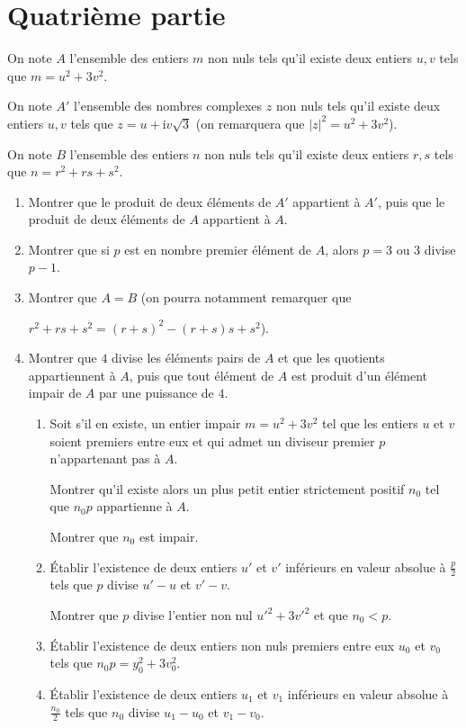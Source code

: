\newpage

\section*{\color{blue}Quatrième partie}
On note $A$ l'ensemble des entiers $m$ non nuls tels qu'il existe
deux entiers $u, v$ tels que $m = u^2 + 3v^2$.

On note $A'$ l'ensemble des nombres complexes $z$ non nuls tels qu'il existe deux entiers
$u, v$ tels que $z = u + \text{i}v\sqrt 3$ (on remarquera que
$|z|^2 = u^2 + 3v^2$).

On note $B$ l'ensemble des entiers $n$ non nuls
tels qu'il existe deux entiers $r,s$ tels que $n=r^2 + rs + s^2$.
\begin{enumerate}
\item Montrer que le produit de deux éléments de $A'$ appartient à $A'$,
puis que le produit de deux éléments de $A$ appartient à $A$.
\item Montrer que si $p$ est en nombre premier élément de $A$, alors $p=3$
ou $3$ divise $p-1$.
\item Montrer que $A=B$ (on pourra notamment remarquer que

$r^2+rs+s^2 = (r+s)^2- (r + s)s + s^2$).
\item Montrer que $4$ divise les éléments pairs de $A$ et que les quotients
appartiennent à $A$, puis que tout élément de $A$ est produit d'un élément
impair de $A$ par une puissance de $4$.
	\begin{enumerate}
		\item Soit s'il en existe, un entier impair $m = u^2 + 3v^2$ tel que les
entiers $u$ et $v$ soient premiers entre eux et qui admet un diviseur
premier $p$ n'appartenant pas à $A$.

Montrer qu'il existe alors un plus petit entier strictement positif $n_0$ tel que $n_0p$ appartienne à $A$.

Montrer que $n_0$ est impair.
		\item Établir l'existence de deux entiers $u'$ et $v'$ inférieurs en valeur
absolue à $\frac p2$ tels que $p$ divise $u'-u$ et $v'-v$.

Montrer que $p$ divise l'entier non nul $u'^2+3v'^2$ et que $n_0<p$.
		\item Établir l'existence de deux entiers non nuls premiers entre eux $u_0$
et $v_0$ tels que $n_0p=y_0^2+3v_0^2$.
		\item Établir l'existence de deux entiers $u_1$ et $v_1$ inférieurs en
valeur absolue à $\frac{n_0}2$ tels que $n_0$ divise $u_1-u_0$ et
$v_1-v_0$. 


\end{enumerate}
\end{enumerate}
